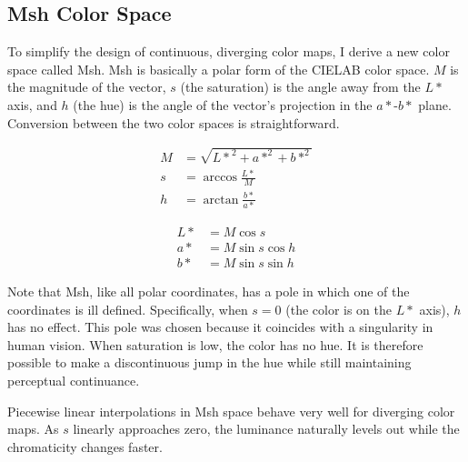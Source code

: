 \documentclass[review,journal]{vgtc}         %
\newcommand{\Lab}{CIELAB\xspace}
\newcommand{\Msh}{Msh\xspace}
\begin{document}
\subsection{\Msh Color Space}
\label{sec:MshColorSpace}

To simplify the design of continuous, diverging color maps, I derive a new
color space called \Msh.  \Msh is basically a polar form of the \Lab color
space.  $M$ is the magnitude of the vector, $s$ (the saturation) is the
angle away from the $L*$ axis, and $h$ (the hue) is the angle of the
vector's projection in the $a*$-$b*$ plane.  Conversion between the two
color spaces is straightforward.

\begin{equation}
  \begin{split}
    M &= \sqrt{{L*}^2 + a*^2 + b*^2} \\
    s &= \arccos \frac{L*}{M} \\
    h &= \arctan \frac{b*}{a*}
  \end{split}
  \label{eqn:LabToMsh}
\end{equation}

\begin{equation}
  \begin{split}
    L* &= M \cos s \\
    a* &= M \sin s \cos h \\
    b* &= M \sin s \sin h
  \end{split}
  \label{eqn:MshToLab}
\end{equation}

Note that \Msh, like all polar coordinates, has a pole in which one of the
coordinates is ill defined.  Specifically, when $s = 0$ (the color is on
the $L*$ axis), $h$ has no effect.  This pole was chosen because it
coincides with a singularity in human vision.  When saturation is low, the
color has no hue.  It is therefore possible to make a discontinuous jump
in the hue while still maintaining perceptual continuance.

Piecewise linear interpolations in \Msh space behave very well for
diverging color maps.  As $s$ linearly approaches zero, the luminance
naturally levels out while the chromaticity changes faster.
\end{document}
